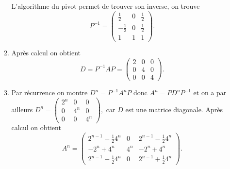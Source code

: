 \begin{correction}
\begin{enumerate}
\begin{enumerate}
L'algorithme du pivot permet de trouver son inverse, on trouve 
$$P^{-1} = \left(\begin{array}{ccc}
\frac{1}{2}&0&\frac{1}{2}\\
-\frac{1}{2}&0&\frac{1}{2}\\
1&1&1
\end{array}
\right).$$
\item Après calcul on obtient 
$$D=P^{-1} A P =\left(\begin{array}{ccc}
2&0&0\\
0&4&0\\
0&0&4
\end{array}
\right).$$
\item Par récurrence on montre $D^n = P^{-1} A^n P$ donc $A^n = P D^n P^{-1}$  et on  a par ailleurs $D^n =\left(\begin{array}{ccc}
2^n&0&0\\
0&4^n&0\\
0&0&4^n
\end{array}
\right), $ car $D$ est une matrice diagonale. 
Après calcul on obtient 
$$A^n  = \left(\begin{array}{ccc}
2^{n-1} +\frac{1}{2} 4^n&0&2^{n-1} -\frac{1}{2} 4^n\\
-2^{n} + 4^n&4^n&-2^{n} + 4^n\\
2^{n-1} -\frac{1}{2} 4^n&0&2^{n-1} +\frac{1}{2} 4^n
\end{array}
\right). $$  
\end{enumerate}
\end{enumerate}
\end{correction}